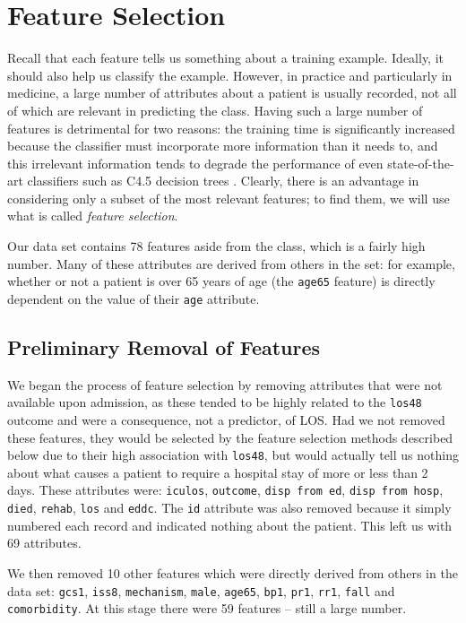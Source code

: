 \chapter{Feature Selection} \label{chap:selection}

Recall that each feature tells
us something about a training example. Ideally, it should also help us
classify the example. However, in practice and particularly
in medicine, a large number of attributes about a patient is usually recorded,
not all of which are relevant in predicting the class.
Having such a large number of features
is detrimental for two reasons: the training time is significantly
increased because the classifier must incorporate more information than it
needs to, and
this irrelevant information tends to degrade the performance
of even state-of-the-art classifiers such as C4.5 decision trees
\cite{Witten2005}. Clearly, there is an advantage in considering only a subset
of the most relevant features; to find them, we will use what is called
\textit{feature selection}.

Our data set contains 78 features aside from the class, which is a fairly high
number. Many of these attributes
are derived from others in the set: for example, whether or not a patient is
over 65 years of age (the \texttt{age65} feature) is directly dependent on the
value of their \texttt{age} attribute.

\section{Preliminary Removal of Features}
We began the process of feature selection by removing attributes that were
not available upon admission, as these tended to be highly related to the
\texttt{los48} outcome and were a consequence, not a predictor, of LOS. Had
we not removed these features, they would be selected by the feature selection
methods described below due to their high association with \texttt{los48}, but
would actually tell us nothing about what causes a patient to require a
hospital stay of more or less than 2 days.
These attributes were: \texttt{iculos}, \texttt{outcome},
\texttt{disp from ed}, \texttt{disp from hosp}, \texttt{died}, \texttt{rehab},
\texttt{los} and \texttt{eddc}.
The \texttt{id} attribute was also removed because it
simply numbered each record and
indicated nothing about the patient. This left us with 69 attributes.

We then removed 10 other features which were directly derived from others in
the data set: \texttt{gcs1}, \texttt{iss8}, \texttt{mechanism}, \texttt{male},
\texttt{age65}, \texttt{bp1}, \texttt{pr1}, \texttt{rr1}, \texttt{fall} and
\texttt{comorbidity}. At this stage there were 59 features -- still a large
number.

